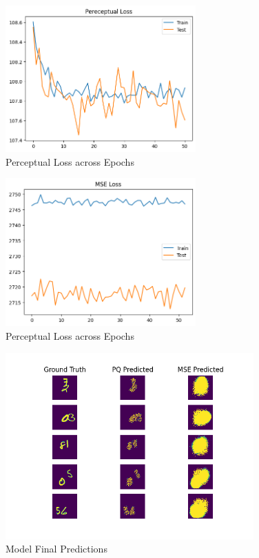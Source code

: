 \documentclass{article}
\begin{document}
\begin{figure}
    \centering
    \includegraphics[width=0.65\textwidth]{report/figures/pq_loss.png}
    \caption{Perceptual Loss across Epochs}
\end{figure}
\begin{figure}
    \centering
    \includegraphics[width=0.65\textwidth]{report/figures/mse_loss.png}
    \caption{Perceptual Loss across Epochs}
\end{figure}
\begin{figure}
    \centering
    \includegraphics[width=0.85\textwidth]{report/figures/predictions.png}
    \caption{Model Final Predictions}
\end{figure}
\end{document}
